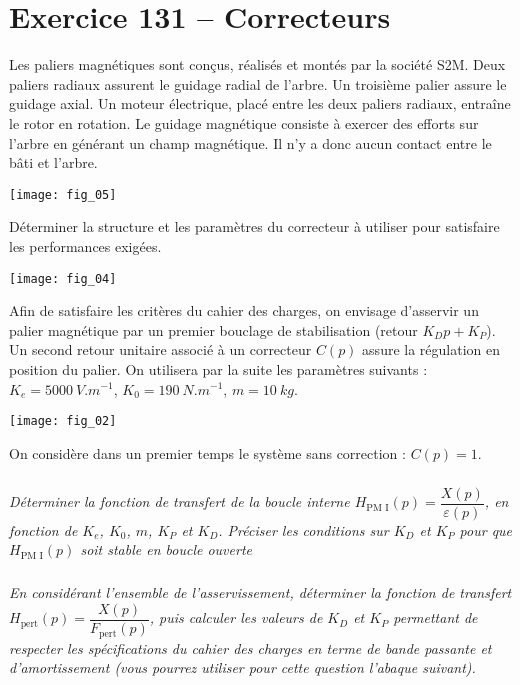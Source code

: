 \section*{Exercice 131 -- Correcteurs}
\setcounter{exo}{0}

Les paliers magnétiques sont conçus, réalisés et montés par la société S2M.
Deux paliers radiaux assurent le guidage radial de l'arbre. Un troisième
palier assure le guidage axial. Un moteur électrique, placé entre les deux
paliers radiaux, entraîne le rotor en rotation. Le guidage magnétique consiste à exercer des efforts sur l'arbre en générant un
champ magnétique. Il n'y a donc aucun contact entre le bâti et l'arbre.

\begin{center}
\texttt{[image: fig\_05]}
\end{center}


\begin{obj}
Déterminer la structure et les paramètres du correcteur à utiliser pour satisfaire les performances exigées.
\end{obj}


\begin{center}
\texttt{[image: fig\_04]}
\end{center}


Afin de satisfaire les critères du cahier des charges, on envisage d'asservir un
palier magnétique par un premier bouclage de stabilisation (retour $K_D p+K_P$).
Un second retour unitaire associé à un correcteur $C(p)$ assure la régulation en
position du palier. On utilisera par la suite les
paramètres suivants : $K_e=\SI{5000}{V.m^{-1}}$, $K_0=\SI{190}{N.m^{-1}}$, $m=\SI{10}{kg}$.

\begin{center}
\texttt{[image: fig\_02]}
\end{center}

On considère dans un premier temps le système sans correction : $C(p)=1$.

\subparagraph{}\textit{Déterminer la fonction de transfert de la boucle interne $H_{\text{PM I}}(p) = \dfrac{X(p)}{\varepsilon(p)}$, en fonction de $K_e$, $K_0$, $m$, $K_P$ et $K_D$. Préciser les conditions
sur $K_D$ et $K_P$ pour que $H_{\text{PM I}}(p)$ soit stable en boucle ouverte}


\subparagraph{}\textit{En considérant l’ensemble de l’asservissement, déterminer la
fonction de transfert $H_{\text{pert}}(p) = \dfrac{X(p)}{F_{\text{pert}}(p)}$, puis calculer les valeurs de $K_D$ et $K_P$
permettant de respecter les spécifications du cahier des charges en terme de
bande passante et d’amortissement (vous pourrez utiliser pour cette question l’abaque suivant).}


